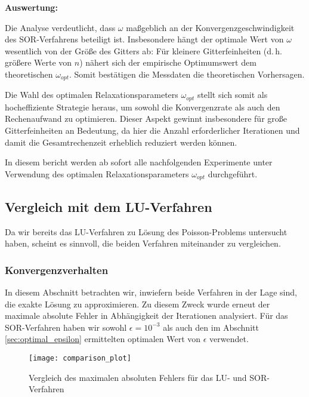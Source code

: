 \documentclass{scrartcl}
\newenvironment{code}{\captionsetup{type=listing}}{}
\begin{document}
\textbf{Auswertung:}

Die Analyse verdeutlicht, dass \(\omega\) maßgeblich an der
Konvergenzgeschwindigkeit des SOR-Verfahrens beteiligt ist. Insbesondere hängt
der optimale Wert von \(\omega\) wesentlich von der Größe des Gitters ab: Für
kleinere Gitterfeinheiten (d.\,h. größere Werte von \(n\)) nähert sich der
empirische Optimumswert dem theoretischen \(\omega_{opt}\). Somit bestätigen
die Messdaten die theoretischen Vorhersagen.

Die Wahl des optimalen Relaxationsparameters \(\omega_{opt}\) stellt sich somit
als hocheffiziente Strategie heraus, um sowohl die Konvergenzrate als auch den
Rechenaufwand zu optimieren. Dieser Aspekt gewinnt insbesondere für große
Gitterfeinheiten an Bedeutung, da hier die Anzahl erforderlicher Iterationen
und damit die Gesamtrechenzeit erheblich reduziert werden können.

In diesem bericht werden ab sofort alle nachfolgenden Experimente unter
Verwendung des optimalen Relaxationsparameters \(\omega_{opt}\) durchgeführt.

\subsection{Vergleich mit dem LU-Verfahren}

Da wir bereits das LU-Verfahren zu Lösung des Poisson-Problems untersucht
haben, scheint es sinnvoll, die beiden Verfahren miteinander zu vergleichen.

\subsubsection{Konvergenzverhalten}

In diesem Abschnitt betrachten wir, inwiefern beide Verfahren in der Lage sind,
die exakte Lösung zu approximieren. Zu diesem Zweck wurde erneut der maximale
absolute Fehler in Abhängigkeit der Iterationen analysiert. Für das
SOR-Verfahren haben wir sowohl $\epsilon = 10^{-3}$ als auch den im Abschnitt
\ref{sec:optimal_epsilon} ermittelten optimalen Wert von \(\epsilon\)
verwendet.

\begin{figure}[H]
    \centering
    \texttt{[image: comparison\_plot]}
    \caption{Vergleich des maximalen absoluten Fehlers für das LU- und
        SOR-Verfahren}
    \label{fig:convergence-comparison}
\end{figure}

\begin{code}
    \label{code:covnergence-comparison}
    \inputminted[firstline=32, lastline=36]{bash}{figures/generate.sh}
\end{code}
\end{document}
